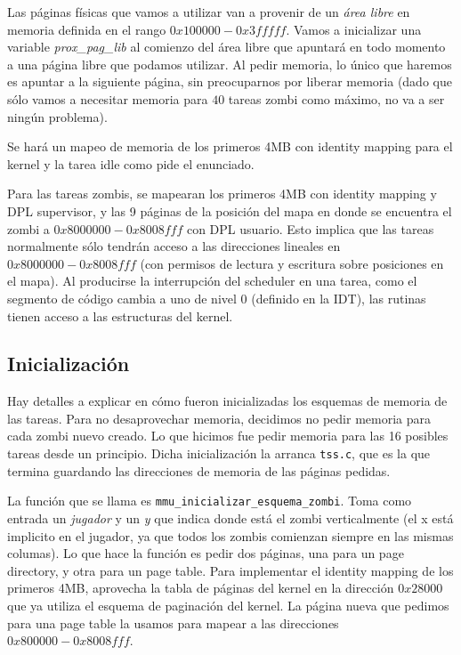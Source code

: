 \documentclass{article}
\begin{document}
	Las páginas físicas que vamos a utilizar van a provenir de un \textit{área libre} en memoria definida en el rango $0x100000 - 0x3fffff$. Vamos a inicializar una variable \textit{prox\_pag\_lib} al comienzo del área libre que apuntará en todo momento a una página libre que podamos utilizar. Al pedir memoria, lo único que haremos es apuntar a la siguiente página, sin preocuparnos por liberar memoria (dado que sólo vamos a necesitar memoria para $40$ tareas zombi como máximo, no va a ser ningún problema).
	
	Se hará un mapeo de memoria de los primeros 4MB con identity mapping para el kernel y la tarea idle como pide el enunciado.
	
	Para las tareas zombis, se mapearan los primeros 4MB con identity mapping y DPL supervisor, y las 9 páginas de la posición del mapa en donde se encuentra el zombi a $0x8000000 - 0x8008fff$ con DPL usuario. Esto implica que las tareas normalmente sólo tendrán acceso a las direcciones lineales en $0x8000000 - 0x8008fff$ (con permisos de lectura y escritura sobre posiciones en el mapa). Al producirse la interrupción del scheduler en una tarea, como el segmento de código cambia a uno de nivel 0 (definido en la IDT), las rutinas tienen acceso a las estructuras del kernel.
	
	\subsection*{Inicialización}
	
	Hay detalles a explicar en cómo fueron inicializadas los esquemas de memoria de las tareas. Para no desaprovechar memoria, decidimos no pedir memoria para cada zombi nuevo creado. Lo que hicimos fue pedir memoria para las 16 posibles tareas desde un principio. Dicha inicialización la arranca \texttt{tss.c}, que es la que termina guardando las direcciones de memoria de las páginas pedidas.
	
	La función que se llama es \texttt{mmu\_inicializar\_esquema\_zombi}. Toma como entrada un \textit{jugador} y un \textit{y} que indica donde está el zombi verticalmente (el x está implicito en el jugador, ya que todos los zombis comienzan siempre en las mismas columas). Lo que hace la función es pedir dos páginas, una para un page directory, y otra para un page table. Para implementar el identity mapping de los primeros 4MB, aprovecha la tabla de páginas del kernel en la dirección $0x28000$ que ya utiliza el esquema de paginación del kernel. La página nueva que pedimos para una page table la usamos para mapear a las direcciones $0x800000- 0x8008fff$.
	
\end{document}
